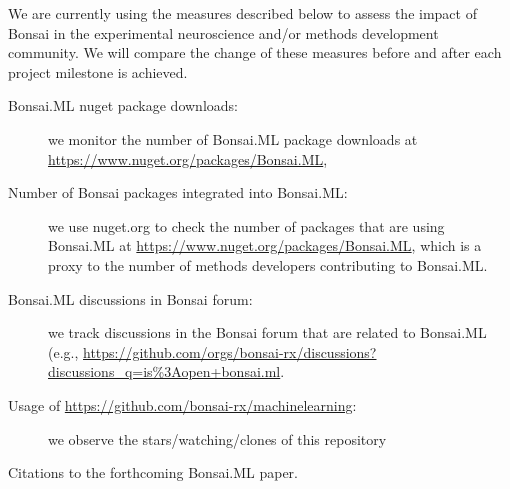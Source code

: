 We are currently using the measures described below to assess the impact of
Bonsai in the experimental neuroscience and/or methods development community.
We will compare the change of these measures before and after each project
milestone is achieved.

\begin{description}

    \item[Bonsai.ML nuget package downloads:] we monitor the number of
    Bonsai.ML package downloads at
    \url{https://www.nuget.org/packages/Bonsai.ML},

    \item[Number of Bonsai packages integrated into Bonsai.ML:] we use
    nuget.org to check the number of packages that are using Bonsai.ML at
    \url{https://www.nuget.org/packages/Bonsai.ML}, which is a proxy to the
    number of methods developers contributing to Bonsai.ML.

    \item[Bonsai.ML discussions in Bonsai forum:] we track discussions in the
    Bonsai forum that are related to Bonsai.ML (e.g.,
    \url{https://github.com/orgs/bonsai-rx/discussions?discussions_q=is%3Aopen+bonsai.ml}.

    \item[Usage of \url{https://github.com/bonsai-rx/machinelearning}:] we
    observe the stars/watching/clones of this repository

    \item[Citations to the forthcoming Bonsai.ML paper.]

\end{description}
